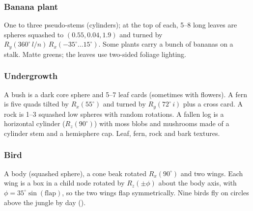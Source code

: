 \subsubsection{Banana plant}
 One to three pseudo-stems (cylinders); at the top of each, 5--8 long leaves are spheres
squashed to $(0.55,0.04,1.9)$ and turned by $R_y(360^\circ\,l/n)\,R_x(-35^\circ\ldots15^\circ)$. Some plants carry a
bunch of bananas on a stalk.
 Matte greens; the leaves use two-sided foliage lighting.

\subsubsection{Undergrowth}
 A bush is a dark core sphere and 5--7 leaf cards (sometimes with flowers). A fern is
five quads tilted by $R_x(55^\circ)$ and turned by $R_y(72^\circ\,i)$ plus a cross card. A rock is 1--3 squashed
low spheres with random rotations. A fallen log is a horizontal cylinder ($R_z(90^\circ)$) with moss blobs and
mushrooms made of a cylinder stem and a hemisphere cap.
 Leaf, fern, rock and bark textures.

\subsubsection{Bird}
 A body (squashed sphere), a cone beak rotated $R_x(90^\circ)$ and two wings. Each wing is a
box in a child node rotated by $R_z(\pm\phi)$ about the body axis, with $\phi = 35^\circ\sin(\text{flap})$, so the two
wings flap symmetrically.
 Nine birds fly on circles above the jungle by day ().

